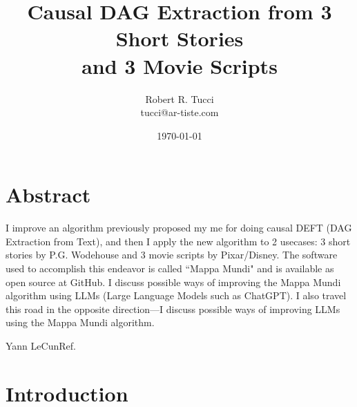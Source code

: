 \documentclass[12pt]{article}
\begin{document}
\title{Causal DAG Extraction from 3 Short Stories  \\
and 3 Movie Scripts}
\date{ \today}
\author{Robert R. Tucci\\
        tucci@ar-tiste.com}
\maketitle
\vskip2cm
\section*{Abstract}
I improve an algorithm previously
proposed my me 
for doing causal DEFT (DAG Extraction from Text), and then I apply the new algorithm to 2 usecases:
3 short stories by P.G. Wodehouse and 3 movie scripts by Pixar/Disney. The software  used to accomplish this 
endeavor is called ``Mappa Mundi" and is available as open source at GitHub. 
I discuss possible ways of improving the Mappa Mundi algorithm 
using LLMs (Large
Language Models such as ChatGPT).
I also travel this road in the opposite direction---I discuss possible ways of improving
LLMs using the Mappa Mundi algorithm.
\newpage

{Yann LeCun}{Ref.\cite{yann-religion}}

\section{Introduction}
\end{document}
